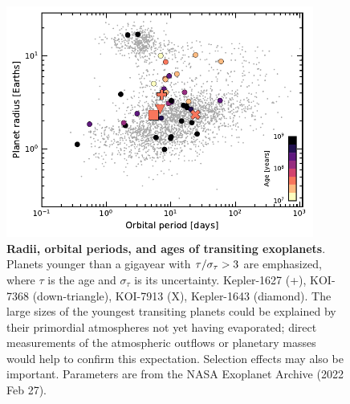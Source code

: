\documentclass[12pt,twocolumn,linenumbers]{aastex63}
\begin{document}
\begin{figure}[!t]
	\begin{center}
		\leavevmode
		\includegraphics[width=0.9\textwidth]{f4.pdf}
	\end{center}
	\vspace{-0.7cm}
	\caption{
		{\bf Radii, orbital periods, and ages of transiting exoplanets}.
		Planets younger than a gigayear with ${\rm \tau}/\sigma_{\tau} >
		3$ are emphasized, where $\tau$ is the age and $\sigma_{\tau}$ is
    its uncertainty. Kepler-1627 (+), KOI-7368 (down-triangle),
    KOI-7913 (X), Kepler-1643 (diamond).  The large sizes of
		the youngest transiting planets could be explained by their
		primordial atmospheres not yet having evaporated; direct
		measurements of the atmospheric outflows or planetary masses would
		help to confirm this expectation.  Selection effects may also be
		important.  Parameters are from the NASA Exoplanet Archive (2022
		Feb 27).
		\label{fig:rp_period_age}
	}
\end{figure}




\end{document}
